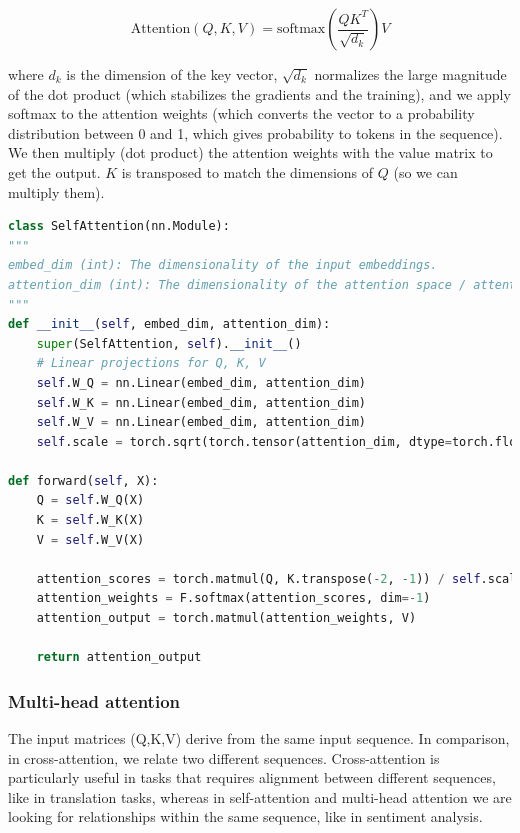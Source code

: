 \begin{equation*}
    \text{Attention}(Q, K, V) = \text{softmax}\left( \frac{QK^T}{\sqrt{d_k}} \right) V
\end{equation*}

where $d_k$ is the dimension of the key vector, $\sqrt{d_k}$ normalizes the large magnitude of the dot product (which stabilizes the gradients and the training), and we apply softmax to the attention weights (which converts the vector to a probability distribution between 0 and 1, which gives probability to tokens in the sequence). We then multiply (dot product) the attention weights with the value matrix to get the output. $K$ is transposed to match the dimensions of $Q$ (so we can multiply them).

\begin{lstlisting}[language=Python, breaklines=true, caption={Full implementation of a single self-attention block.}]
class SelfAttention(nn.Module):
"""
embed_dim (int): The dimensionality of the input embeddings.
attention_dim (int): The dimensionality of the attention space / attention vectors (Q, K, V).
"""
def __init__(self, embed_dim, attention_dim):
    super(SelfAttention, self).__init__()
    # Linear projections for Q, K, V
    self.W_Q = nn.Linear(embed_dim, attention_dim)
    self.W_K = nn.Linear(embed_dim, attention_dim)
    self.W_V = nn.Linear(embed_dim, attention_dim)
    self.scale = torch.sqrt(torch.tensor(attention_dim, dtype=torch.float32))

def forward(self, X):
    Q = self.W_Q(X)
    K = self.W_K(X)
    V = self.W_V(X)

    attention_scores = torch.matmul(Q, K.transpose(-2, -1)) / self.scale
    attention_weights = F.softmax(attention_scores, dim=-1)
    attention_output = torch.matmul(attention_weights, V)

    return attention_output
\end{lstlisting}










\subsubsection{Multi-head attention}

The input matrices (Q,K,V) derive from the same input sequence. In comparison, in cross-attention, we relate two different sequences. Cross-attention is particularly useful in tasks that requires alignment between different sequences, like in translation tasks, whereas in self-attention and multi-head attention we are looking for relationships within the same sequence, like in sentiment analysis.

